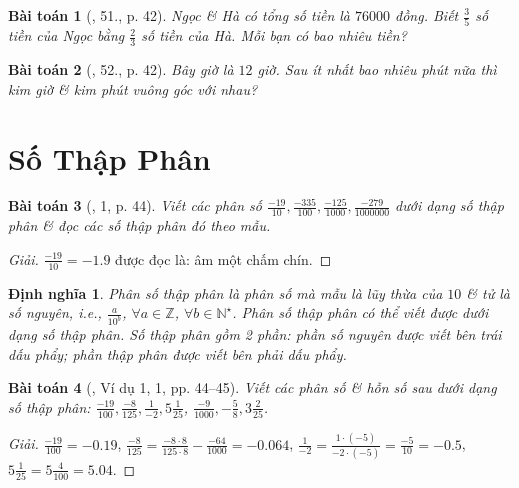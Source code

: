 \documentclass{article}
\newtheorem{baitoan}{Bài toán}
\newtheorem{dinhnghia}{Định nghĩa}
\begin{document}
\begin{baitoan}[\cite{SBT_Toan_6_Canh_Dieu_tap_2}, 51., p. 42]
	Ngọc \& Hà có tổng số tiền là $76000$ đồng. Biết $\frac{3}{5}$ số tiền của Ngọc bằng $\frac{2}{3}$ số tiền của Hà. Mỗi bạn có bao nhiêu tiền?
\end{baitoan}

\begin{baitoan}[\cite{SBT_Toan_6_Canh_Dieu_tap_2}, 52., p. 42]
	Bây giờ là $12$ giờ. Sau ít nhất bao nhiêu phút nữa thì kim giờ \& kim phút vuông góc với nhau?
\end{baitoan}


\section{Số Thập Phân}

\begin{baitoan}[\cite{SGK_Toan_6_Canh_Dieu_tap_2}, 1, p. 44]
	Viết các phân số $\frac{-19}{10},\frac{-335}{100},\frac{-125}{1000},\frac{-279}{1000000}$ dưới dạng số thập phân \& đọc các số thập phân đó theo mẫu.
\end{baitoan}

\begin{proof}[Giải]
	$\frac{-19}{10} = -1.9$ được đọc là: âm một chấm chín.
\end{proof}

\begin{dinhnghia}
	\emph{Phân số thập phân} là phân số mà mẫu là lũy thừa của $10$ \& tử là số nguyên, i.e., $\frac{a}{10^b}$, $\forall a\in\mathbb{Z}$, $\forall b\in\mathbb{N}^\star$. Phân số thập phân có thể viết được dưới dạng \emph{số thập phân}. Số thập phân gồm 2 phần: \emph{phần số nguyên} được viết bên trái dấu phẩy; \emph{phần thập phân} được viết bên phải dấu phẩy.
\end{dinhnghia}

\begin{baitoan}[\cite{SGK_Toan_6_Canh_Dieu_tap_2}, Ví dụ 1, 1, pp. 44--45]
	Viết các phân số \& hỗn số sau dưới dạng số thập phân: $\frac{-19}{100},\frac{-8}{125},\frac{1}{-2},5\frac{1}{25}$, $\frac{-9}{1000},-\frac{5}{8},3\frac{2}{25}$.
\end{baitoan}

\begin{proof}[Giải]
	$\frac{-19}{100} = -0.19$, $\frac{-8}{125} = \frac{-8\cdot8}{125\cdot8} - \frac{-64}{1000} = -0.064$, $\frac{1}{-2} = \frac{1\cdot(-5)}{-2\cdot(-5)} = \frac{-5}{10} = -0.5$, $5\frac{1}{25} = 5\frac{4}{100} = 5.04$.
\end{proof}
\end{document}

